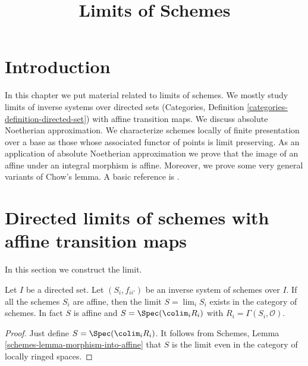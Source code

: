 

%


\title{Limits of Schemes}


\maketitle

\label{section-phantom}

\tableofcontents

\section{Introduction}
\label{section-introduction}

\noindent
In this chapter we put material related to limits of schemes. We mostly
study limits of inverse systems over directed sets
(Categories, Definition \ref{categories-definition-directed-set})
with affine transition maps. We discuss absolute Noetherian
approximation. We characterize schemes locally of finite presentation
over a base as those whose associated functor of points is limit
preserving. As an application of absolute Noetherian approximation
we prove that the image of an affine under an integral morphism is affine.
Moreover, we prove some very general variants of Chow's lemma.
A basic reference is \cite{EGA}.




\section{Directed limits of schemes with affine transition maps}
\label{section-limits}

\noindent
In this section we construct the limit.

\begin{lemma}
\label{lemma-directed-inverse-system-affine-schemes-has-limit}
Let $I$ be a directed set. Let $(S_i, f_{ii'})$ be an inverse system of
schemes over $I$.  If all the schemes $S_i$
are affine, then the limit $S = \lim_i S_i$ exists
in the category of schemes.
In fact $S$ is affine and $S = \Spec(\colim_i R_i)$
with $R_i = \Gamma(S_i, \mathcal{O})$.
\end{lemma}

\begin{proof}
Just define $S = \Spec(\colim_i R_i)$.
It follows from Schemes, Lemma \ref{schemes-lemma-morphism-into-affine}
that $S$ is the limit even in the category of locally ringed spaces.
\end{proof}

